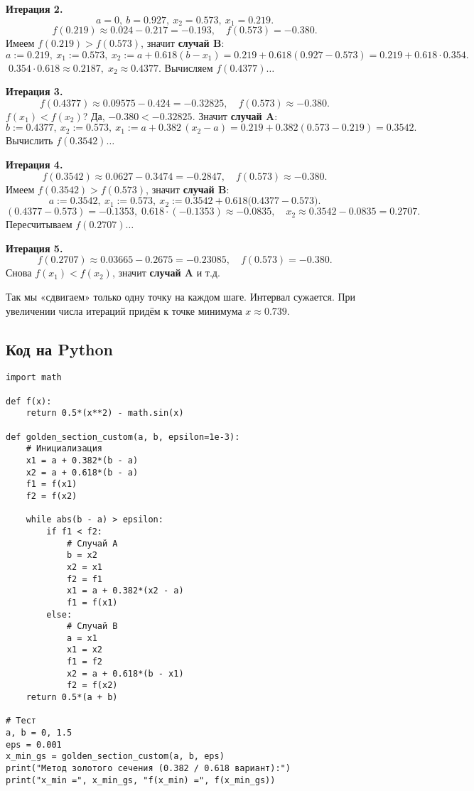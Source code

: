\documentclass[12pt]{article}
\begin{document}
\textbf{Итерация 2.}
\[
a=0,\ b=0.927,\ x_2=0.573,\ x_1=0.219.
\]
\[
f(0.219)\approx 0.024 - 0.217=-0.193,\quad f(0.573)=-0.380.
\]
Имеем $f(0.219)>f(0.573)$, значит \textbf{случай B}:
\[
a:=0.219,\ x_1:=0.573,\ 
x_2:= a + 0.618(b - x_1)=0.219+0.618(0.927-0.573)=0.219+0.618\cdot0.354.
\]
$\;0.354\cdot0.618\approx0.2187,\; x_2\approx0.4377$. Вычисляем $f(0.4377)\dots$

\textbf{Итерация 3.}
\[
f(0.4377)\approx 0.09575 - 0.424 = -0.32825,
\quad f(0.573)\approx -0.380.
\]
$f(x_1)<f(x_2)$? Да, $-0.380 < -0.32825$. Значит \textbf{случай A}:
\[
b:=0.4377,\ x_2:=0.573,\ 
x_1:=a+0.382\,(x_2-a)=0.219+0.382(0.573-0.219)=0.3542.
\]
Вычислить $f(0.3542)\dots$

\textbf{Итерация 4.}
\[
f(0.3542)\approx 0.0627-0.3474=-0.2847,\quad 
f(0.573)\approx -0.380.
\]
Имеем $f(0.3542)>f(0.573)$, значит \textbf{случай B}:
\[
a:=0.3542,\ x_1:=0.573,\ 
x_2:=0.3542 + 0.618\bigl(0.4377-0.573\bigr).
\]
\[
(0.4377-0.573)=-0.1353,\; 0.618\cdot(-0.1353)\approx -0.0835,\quad
x_2\approx 0.3542-0.0835=0.2707.
\]
Пересчитываем $f(0.2707)\dots$

\textbf{Итерация 5.}
\[
f(0.2707)\approx 0.03665 - 0.2675=-0.23085,\quad 
f(0.573)=-0.380.
\]
Снова $f(x_1)<f(x_2)$, значит \textbf{случай A} и т.д.

Так мы «сдвигаем» только одну точку на каждом шаге. Интервал сужается. При увеличении числа итераций придём к точке минимума $x\approx0.739$.

\subsection{Код на Python}

\begin{verbatim}
import math

def f(x):
    return 0.5*(x**2) - math.sin(x)

def golden_section_custom(a, b, epsilon=1e-3):
    # Инициализация
    x1 = a + 0.382*(b - a)
    x2 = a + 0.618*(b - a)
    f1 = f(x1)
    f2 = f(x2)

    while abs(b - a) > epsilon:
        if f1 < f2:
            # Случай A
            b = x2
            x2 = x1
            f2 = f1
            x1 = a + 0.382*(x2 - a)
            f1 = f(x1)
        else:
            # Случай B
            a = x1
            x1 = x2
            f1 = f2
            x2 = a + 0.618*(b - x1)
            f2 = f(x2)
    return 0.5*(a + b)

# Тест
a, b = 0, 1.5
eps = 0.001
x_min_gs = golden_section_custom(a, b, eps)
print("Метод золотого сечения (0.382 / 0.618 вариант):")
print("x_min =", x_min_gs, "f(x_min) =", f(x_min_gs))
\end{verbatim}
\end{document}
